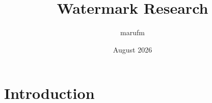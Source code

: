 \documentclass{article}
\title{Watermark Research}
\author{marufm }
\date{August 2026}
\begin{document}
\maketitle

\section{Introduction}
\end{document}
